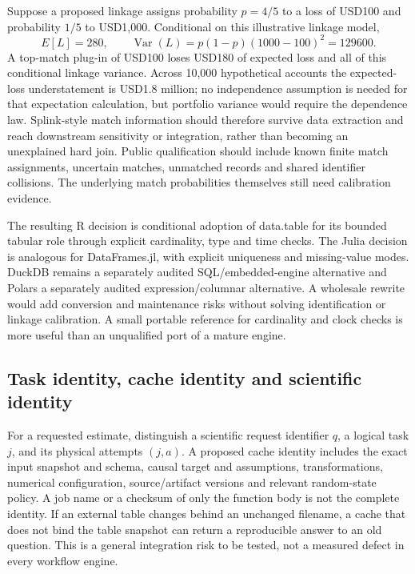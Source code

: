 Suppose a proposed linkage assigns probability $p=4/5$ to a loss of USD100 and probability $1/5$ to USD1,000. Conditional on this illustrative linkage model,
\[
 E[L]=280,\qquad
 \operatorname{Var}(L)=p(1-p)(1000-100)^2=129600.
\]
A top-match plug-in of USD100 loses USD180 of expected loss and all of this conditional linkage variance. Across 10,000 hypothetical accounts the expected-loss understatement is USD1.8 million; no independence assumption is needed for that expectation calculation, but portfolio variance would require the dependence law. Splink-style match information should therefore survive data extraction and reach downstream sensitivity or integration, rather than becoming an unexplained hard join. Public qualification should include known finite match assignments, uncertain matches, unmatched records and shared identifier collisions. The underlying match probabilities themselves still need calibration evidence.~\citep{exec24_splink_sources,exec24_splink_contract,exec25_dww_choice}

The resulting R decision is conditional adoption of data.table for its bounded tabular role through explicit cardinality, type and time checks. The Julia decision is analogous for DataFrames.jl, with explicit uniqueness and missing-value modes. DuckDB remains a separately audited SQL/embedded-engine alternative and Polars a separately audited expression/columnar alternative. A wholesale rewrite would add conversion and maintenance risks without solving identification or linkage calibration. A small portable reference for cardinality and clock checks is more useful than an unqualified port of a mature engine.~\citep{exec19_duckdb_source,exec19_duckdb_reference,exec23_polars_sources,exec23_polars_reference,exec25_otm_polars,exec25_dww_choice}

\subsection{Task identity, cache identity and scientific identity}

For a requested estimate, distinguish a scientific request identifier $q$, a logical task $j$, and its physical attempts $(j,a)$. A proposed cache identity includes the exact input snapshot and schema, causal target and assumptions, transformations, numerical configuration, source/artifact versions and relevant random-state policy. A job name or a checksum of only the function body is not the complete identity. If an external table changes behind an unchanged filename, a cache that does not bind the table snapshot can return a reproducible answer to an old question. This is a general integration risk to be tested, not a measured defect in every workflow engine.~\citep{exec25_dww_choice,exec24_openlineage_source,exec24_openlineage_reference}

